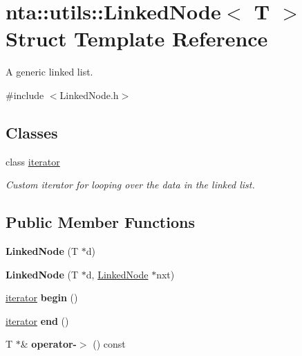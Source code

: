 \hypertarget{structnta_1_1utils_1_1LinkedNode}{}\section{nta\+:\+:utils\+:\+:Linked\+Node$<$ T $>$ Struct Template Reference}
\label{structnta_1_1utils_1_1LinkedNode}


A generic linked list.  




{\ttfamily \#include $<$Linked\+Node.\+h$>$}

\subsection*{Classes}
\begin{DoxyCompactItemize}
\item 
class \hyperlink{classnta_1_1utils_1_1LinkedNode_1_1iterator}{iterator}
\begin{DoxyCompactList}\small\item\em Custom iterator for looping over the data in the linked list. \end{DoxyCompactList}\end{DoxyCompactItemize}
\subsection*{Public Member Functions}
\begin{DoxyCompactItemize}
\item 
\mbox{\label{structnta_1_1utils_1_1LinkedNode_a575e213c5d1022c298f6d9a117c8b081}} 
{\bfseries Linked\+Node} (T $\ast$d)
\item 
\mbox{\label{structnta_1_1utils_1_1LinkedNode_a7d45b5366f553fbb7a2228382c4e76db}} 
{\bfseries Linked\+Node} (T $\ast$d, \hyperlink{structnta_1_1utils_1_1LinkedNode}{Linked\+Node} $\ast$nxt)
\item 
\mbox{\label{structnta_1_1utils_1_1LinkedNode_a3fc466b54e08df4f2d9823c24b5d2334}} 
\hyperlink{classnta_1_1utils_1_1LinkedNode_1_1iterator}{iterator} {\bfseries begin} ()
\item 
\mbox{\label{structnta_1_1utils_1_1LinkedNode_a64ffaf974b9276f8860581b20bd88bf0}} 
\hyperlink{classnta_1_1utils_1_1LinkedNode_1_1iterator}{iterator} {\bfseries end} ()
\item 
\mbox{\label{structnta_1_1utils_1_1LinkedNode_aecd5ee752f5c0f146ebc6af096655324}} 
T $\ast$\& {\bfseries operator-\/$>$} () const
\end{DoxyCompactItemize}
